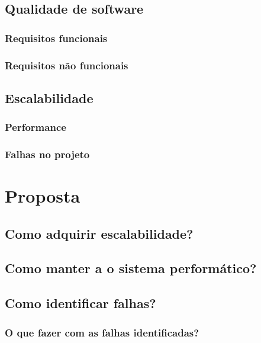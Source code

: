 \documentclass[]{../class/politex}
\begin{document}
    \section{Qualidade de software}

      \subsection{Requisitos funcionais}

      \subsection{Requisitos não funcionais}

    \section{Escalabilidade}

      \subsection{Performance}

      \subsection{Falhas no projeto}

  \chapter{Proposta}

    \section{Como adquirir escalabilidade?}

    \section{Como manter a o sistema performático?}

    \section{Como identificar falhas?}

      \subsection{O que fazer com as falhas identificadas?}
\end{document}
